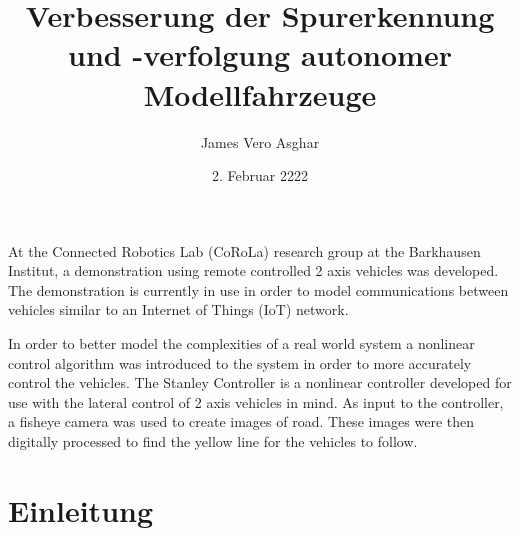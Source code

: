 \documentclass[arbeit=studie,oneside,BCOR=12mm]{ArbeitRST}
\begin{document}

\author{James Vero Asghar}



\title{Verbesserung der Spurerkennung und -verfolgung autonomer Modellfahrzeuge}

\subtitle{}


\date{2. Februar 2222}


\pagestyle{plain}


\maketitle



\selbststaendigkeitserklaerung


{At the Connected Robotics Lab (CoRoLa) research group at the Barkhausen
Institut, a demonstration using remote controlled 2 axis vehicles was
developed. The demonstration is currently in use in order to model
communications between vehicles similar to an Internet of Things (IoT) network.

In order to better model the complexities of a real world system a nonlinear
control algorithm was introduced to the system in order to more accurately
control the vehicles. The Stanley Controller is a nonlinear controller
developed for use with the lateral control of 2 axis vehicles in mind. As input
to the controller, a fisheye camera was used to create images of road. These
images were then digitally processed to find the yellow line for the vehicles
to follow.}


\tableofcontents

\chapter{Einleitung}
\end{document}
